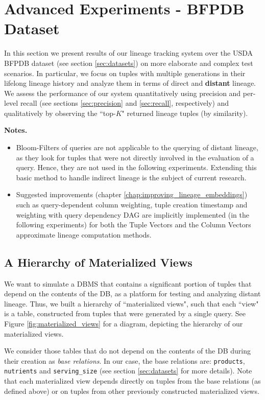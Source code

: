 \section{Advanced Experiments - BFPDB Dataset}\label{sec:advanced_experiments}
In this section we present results of our lineage tracking system over the USDA BFPDB dataset (see section \ref{sec:datasets}) on more elaborate and complex test scenarios. In particular, we focus on tuples with multiple generations in their lifelong lineage history and analyze them in terms of direct and \textbf{distant} lineage.
We assess the performance of our system quantitatively using precision and per-level recall (see sections \ref{sec:precision} and \ref{sec:recall}, respectively) and qualitatively by observing the ``top-$K$" returned lineage tuples (by similarity).
\par\textbf{Notes.}
\begin{itemize}
    \item Bloom-Filters of queries are not applicable to the querying of distant lineage, as they look for tuples that were not directly involved in the evaluation of a query. Hence, they are not used in the following experiments. Extending this basic method to handle indirect lineage is the subject of current research.
    \item Suggested improvements (chapter \ref{chap:improving_lineage_embeddings}) such as query-dependent column weighting, tuple creation timestamp and weighting with query dependency DAG are implicitly implemented (in the following experiments) for both the Tuple Vectors and the Column Vectors approximate lineage computation methods.
\end{itemize}


\subsection{A Hierarchy of Materialized Views}
We want to simulate a DBMS that contains a significant portion of tuples that depend on the contents of the DB, as a platform for testing and analyzing distant lineage. Thus, we built a hierarchy of ``materialized views", such that each ``view" is a table, constructed from tuples that were generated by a single query. See Figure \ref{fig:materialized_views} for a diagram, depicting the hierarchy of our materialized views.

\par We consider those tables that do not depend on the contents of the DB during their creation  as \textit{base relations}. In our case, the base relations are: \texttt{products}, \texttt{nutrients} and \texttt{serving\_size} (see section \ref{sec:datasets} for more details). Note that each materialized view depends directly on tuples from the base relations (as defined above) or on tuples from other previously constructed materialized views.

